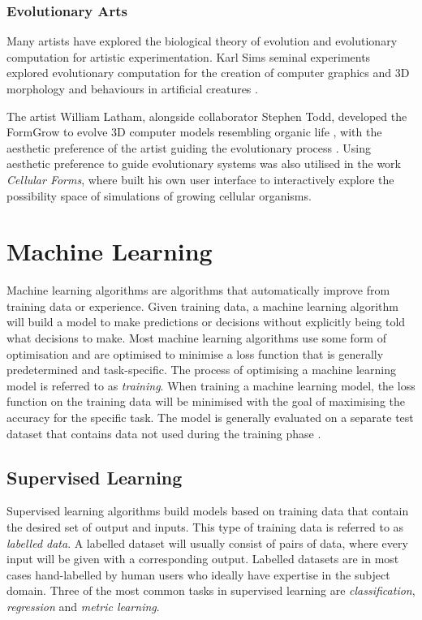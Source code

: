 \subsubsection{Evolutionary Arts}

Many artists have explored the biological theory of evolution and evolutionary computation for artistic experimentation.
Karl Sims seminal experiments explored evolutionary computation for the creation of computer graphics \citep{sims1991artificial} and 3D morphology and behaviours in artificial creatures \citep{sims1994evolving, sims2023evolving}.

The artist William Latham, alongside collaborator Stephen Todd, developed the FormGrow to evolve 3D computer models resembling organic life \citep{latham1992evolutionary}, with the aesthetic preference of the artist guiding the evolutionary process \citep{lambert2013emergence}.
Using aesthetic preference to guide evolutionary systems was also utilised in the work \textit{Cellular Forms}, where \cite{lomas2014cellular} built his own user interface to interactively explore the possibility space of simulations of growing cellular organisms.

\section{Machine Learning}
\label{c2:sec:ml}
Machine learning algorithms are algorithms that automatically improve from training data or experience. 
Given training data, a machine learning algorithm will build a model to make predictions or decisions without explicitly being told what decisions to make. 
Most machine learning algorithms use some form of optimisation and are optimised to minimise a loss function that is generally predetermined and task-specific. 
The process of optimising a machine learning model is referred to as \emph{training}. 
When training a machine learning model, the loss function on the training data will be minimised with the goal of maximising the accuracy for the specific task. 
The model is generally evaluated on a separate test dataset that contains data not used during the training phase \citep{murphy2012machine}.

\subsection{Supervised Learning}

Supervised learning algorithms build models based on training data that contain the desired set of output and inputs. 
This type of training data is referred to as \emph{labelled data}. 
A labelled dataset will usually consist of pairs of data, where every input will be given with a corresponding output. 
Labelled datasets are in most cases hand-labelled by human users who ideally have expertise in the subject domain.
Three of the most common tasks in supervised learning are \emph{classification}, \emph{regression} and \emph{metric learning}. 



